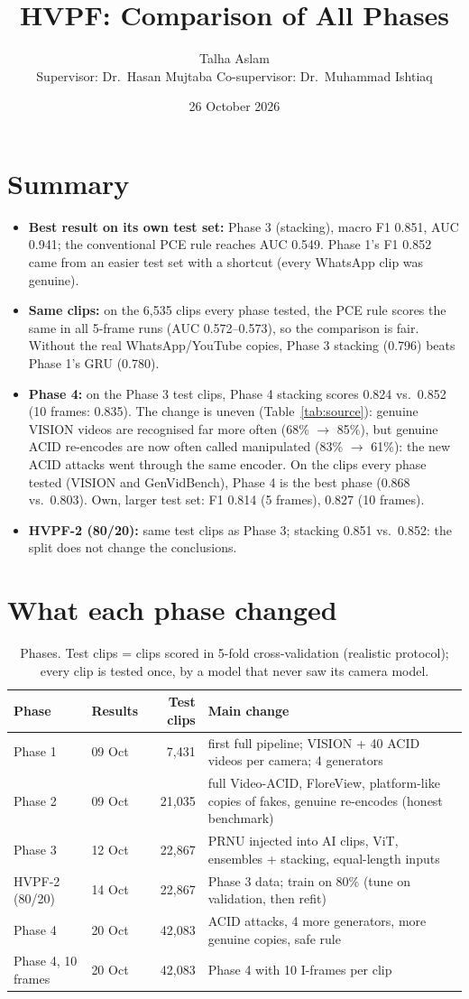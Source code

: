 \documentclass[11pt,a4paper]{article}
\title{\textbf{HVPF: Comparison of All Phases}}
\author{Talha Aslam\\ \small Supervisor: Dr.\ Hasan Mujtaba \quad Co-supervisor: Dr.\ Muhammad Ishtiaq}
\date{26 October 2026}
\begin{document}
\maketitle
\section*{Summary}\begin{itemize}
\item \textbf{Best result on its own test set:} Phase 3 (stacking), macro F1 0.851, AUC 0.941; the conventional PCE rule reaches AUC 0.549. Phase 1's F1 0.852 came from an easier test set with a shortcut (every WhatsApp clip was genuine).
\item \textbf{Same clips:} on the 6,535 clips every phase tested, the PCE rule scores the same in all 5-frame runs (AUC 0.572--0.573), so the comparison is fair. Without the real WhatsApp/YouTube copies, Phase 3 stacking (0.796) beats Phase 1's GRU (0.780).
\item \textbf{Phase 4:} on the Phase 3 test clips, Phase 4 stacking scores 0.824 vs.\ 0.852 (10 frames: 0.835). The change is uneven (Table~\ref{tab:source}): genuine VISION videos are recognised far more often (68\% $\rightarrow$ 85\%), but genuine ACID re-encodes are now often called manipulated (83\% $\rightarrow$ 61\%): the new ACID attacks went through the same encoder. On the clips every phase tested (VISION and GenVidBench), Phase 4 is the best phase (0.868 vs.\ 0.803). Own, larger test set: F1 0.814 (5 frames), 0.827 (10 frames).
\item \textbf{HVPF-2 (80/20):} same test clips as Phase 3; stacking 0.851 vs.\ 0.852: the split does not change the conclusions.
\end{itemize}
\section{What each phase changed}
\begin{table}[H]\centering\small\begin{tabularx}{\linewidth}{llrY}\toprule Phase & Results & Test clips & Main change \\\midrule
Phase 1 & 09 Oct & 7,431 & first full pipeline; VISION + 40 ACID videos per camera; 4 generators \\
Phase 2 & 09 Oct & 21,035 & full Video-ACID, FloreView, platform-like copies of fakes, genuine re-encodes (honest benchmark) \\
Phase 3 & 12 Oct & 22,867 & PRNU injected into AI clips, ViT, ensembles + stacking, equal-length inputs \\
HVPF-2 (80/20) & 14 Oct & 22,867 & Phase 3 data; train on 80\% (tune on validation, then refit) \\
Phase 4 & 20 Oct & 42,083 & ACID attacks, 4 more generators, more genuine copies, safe rule \\
Phase 4, 10 frames & 20 Oct & 42,083 & Phase 4 with 10 I-frames per clip \\
\bottomrule\end{tabularx}\caption{Phases. Test clips = clips scored in 5-fold cross-validation (realistic protocol); every clip is tested once, by a model that never saw its camera model.}\end{table}
\end{document}
